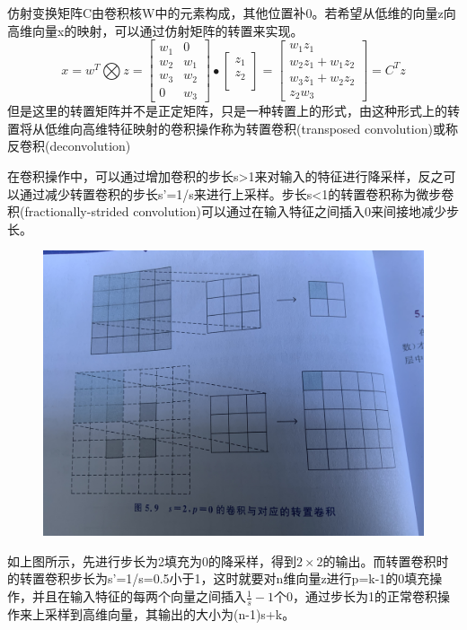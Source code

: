 \documentclass[openbib]{article}
\begin{document}
仿射变换矩阵C由卷积核W中的元素构成，其他位置补0。若希望从低维的向量z向高维向量x的映射，可以通过仿射矩阵的转置来实现。
$$x = w^T \bigotimes z = \begin{bmatrix}
	w_1 & 0\\
	w_2  &w_1  \\
	w_3 & w_2 \\
	0  & w_3
\end{bmatrix} \bullet \begin{bmatrix}
	z_1 \\
	z_2 \\
\end{bmatrix} =\begin{bmatrix}
	w_1z_1 \\
	w_2z_1+w_1z_2\\
	w_3z_1+w_2z_2\\
	z_2w_3 
\end{bmatrix}= C^Tz$$
但是这里的转置矩阵并不是正定矩阵，只是一种转置上的形式，由这种形式上的转置将从低维向高维特征映射的卷积操作称为转置卷积(transposed convolution)或称反卷积(deconvolution)

在卷积操作中，可以通过增加卷积的步长s>1来对输入的特征进行降采样，反之可以通过减少转置卷积的步长s'=1/s来进行上采样。步长s<1的转置卷积称为微步卷积(fractionally-strided convolution)可以通过在输入特征之间插入0来间接地减少步长。
\begin{figure}[htbp]
	\centering
	\includegraphics[scale=0.05]{转置卷积}
\end{figure}

如上图所示，先进行步长为2填充为0的降采样，得到$2\times 2$的输出。而转置卷积时的转置卷积步长为s'=1/s=0.5小于1，这时就要对n维向量z进行p=k-1的0填充操作，并且在输入特征的每两个向量之间插入$\frac{1}{s}-1$个0，通过步长为1的正常卷积操作来上采样到高维向量，其输出的大小为(n-1)s+k。
\end{document}
